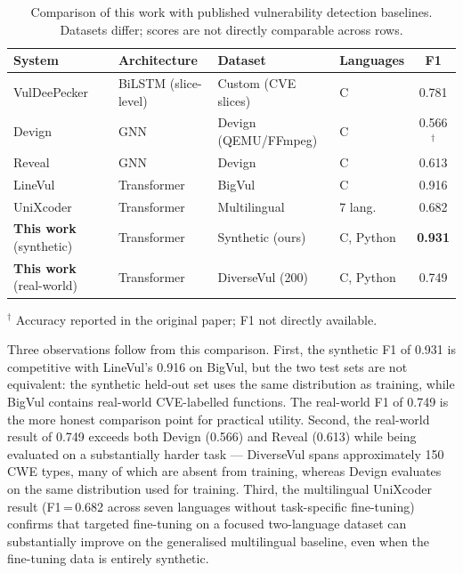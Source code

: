\begin{table}[H]
  \centering
  \small
  \caption{Comparison of this work with published vulnerability detection baselines.
           Datasets differ; scores are not directly comparable across rows.}
  \label{tab:baseline_comparison}
  \begin{tabular}{llllc}
    \toprule
    System & Architecture & Dataset & Languages & F1 \\
    \midrule
    VulDeePecker~\cite{li2018vuldeepecker}  & BiLSTM (slice-level) & Custom (CVE slices) & C       & 0.781 \\
    Devign~\cite{zhou2019devign}            & GNN                  & Devign (QEMU/FFmpeg) & C      & 0.566$^\dagger$ \\
    Reveal~\cite{chakraborty2022reveal}     & GNN                  & Devign               & C       & 0.613 \\
    LineVul~\cite{fu2022linevul}            & Transformer          & BigVul               & C       & 0.916 \\
    UniXcoder~\cite{shu2026multilingual}    & Transformer          & Multilingual         & 7 lang. & 0.682 \\
    \midrule
    \textbf{This work} (synthetic)          & Transformer          & Synthetic (ours)     & C, Python & \textbf{0.931} \\
    \textbf{This work} (real-world)         & Transformer          & DiverseVul (200)     & C, Python & 0.749 \\
    \bottomrule
  \end{tabular}
  \begin{flushleft}
    \small $^\dagger$ Accuracy reported in the original paper; F1 not directly available.
  \end{flushleft}
\end{table}

Three observations follow from this comparison.
First, the synthetic F1 of 0.931 is competitive with LineVul's 0.916 on BigVul, but the
two test sets are not equivalent: the synthetic held-out set uses the same distribution
as training, while BigVul contains real-world CVE-labelled functions.
The real-world F1 of 0.749 is the more honest comparison point for practical utility.
Second, the real-world result of 0.749 exceeds both Devign (0.566) and Reveal (0.613)
while being evaluated on a substantially harder task --- DiverseVul spans approximately
150 CWE types, many of which are absent from training, whereas Devign evaluates on the
same distribution used for training.
Third, the multilingual UniXcoder result (F1\,=\,0.682 across seven languages without
task-specific fine-tuning) confirms that targeted fine-tuning on a focused two-language
dataset can substantially improve on the generalised multilingual baseline,
even when the fine-tuning data is entirely synthetic.

